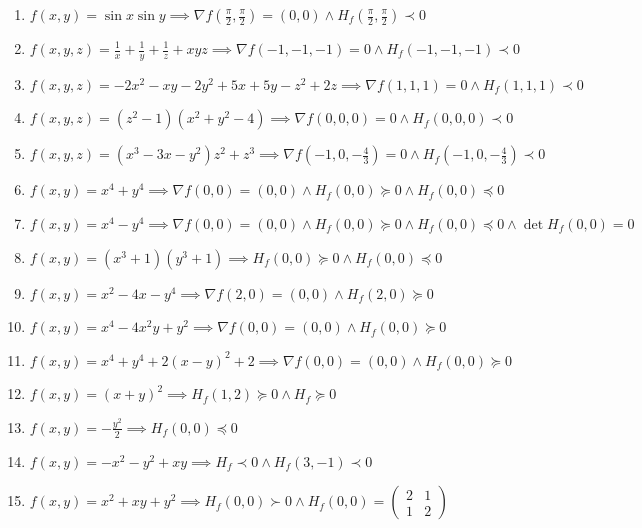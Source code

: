 \documentclass[11pt,a4paper]{article}
\begin{document}
\begin{enumerate}
\item $\displaystyle f(x, y) = \sin x \sin y \implies \nabla f\left( \frac{\pi}{2}, \frac{\pi}{2} \right) = (0, 0) \land H_{f}\left( \frac{\pi}{2}, \frac{\pi}{2} \right) \prec 0$
\item $\displaystyle f(x, y, z) = \frac{1}{x} + \frac{1}{y} + \frac{1}{z} + xyz \implies \nabla f(-1, -1, -1) = 0 \land H_{f}(-1, -1, -1) \prec 0$
\item $\displaystyle f(x, y, z) = -2x^{2} - xy - 2y^{2} + 5x + 5y - z^{2} + 2z \implies \nabla f(1, 1, 1) = 0 \land H_{f}(1, 1, 1) \prec 0$
\item $\displaystyle f(x, y, z) = (z^{2} - 1)(x^{2} + y^{2} - 4) \implies \nabla f(0, 0, 0) = 0 \land H_{f}(0, 0, 0) \prec 0$
\item $\displaystyle f(x, y, z) = (x^{3} - 3x - y^{2}) z^{2} + z^{3} \implies \nabla f\left( -1, 0, -\frac{4}{3} \right) = 0 \land H_{f}\left( -1, 0, -\frac{4}{3} \right) \prec 0$
\item $\displaystyle f(x, y) = x^{4} + y^{4} \implies \nabla f(0, 0) = (0, 0) \land H_{f}(0, 0) \succeq 0 \land H_{f}(0, 0) \preceq 0$
\item $\displaystyle f(x, y) = x^{4} - y^{4} \implies \nabla f(0, 0) = (0, 0) \land H_{f}(0, 0) \succeq 0 \land H_{f}(0, 0) \preceq 0 \land \det H_{f}(0, 0) = 0$
\item $\displaystyle f(x, y) = (x^{3} + 1)(y^{3} + 1) \implies H_{f}(0, 0) \succeq 0 \land H_{f}(0, 0) \preceq 0$
\item $\displaystyle f(x, y) = x^{2} - 4x - y^{4} \implies \nabla f(2, 0) = (0, 0) \land H_{f}(2, 0) \succeq 0$
\item $\displaystyle f(x, y) = x^{4} - 4x^{2} y + y^{2} \implies \nabla f(0, 0) = (0, 0) \land H_{f}(0, 0) \succeq 0$
\item $\displaystyle f(x, y) = x^{4} + y^{4} + 2(x - y)^{2} + 2 \implies \nabla f(0, 0) = (0, 0) \land H_{f}(0, 0) \succeq 0$
\item $\displaystyle f(x, y) = (x + y)^{2} \implies H_{f}(1, 2) \succeq 0 \land H_{f} \succeq 0$
\item $\displaystyle f(x, y) = -\frac{y^{2}}{2} \implies H_{f}(0, 0) \preceq 0$
\item $\displaystyle f(x, y) = -x^{2} - y^{2} + xy \implies H_{f} \prec 0 \land H_{f}(3, -1) \prec 0$
\item $\displaystyle f(x, y) = x^{2} + xy + y^{2} \implies H_{f}(0, 0) \succ 0 \land H_{f}(0, 0) = \begin{pmatrix} 2 & 1 \\ 1 & 2 \end{pmatrix}$

\end{enumerate}
\end{document}
